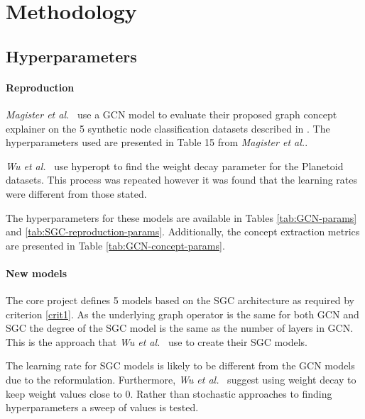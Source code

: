 \section{Methodology}

\subsection{Hyperparameters}
\label{sec:hyperparameters}

\paragraph{Reproduction}
\textit{Magister et al.}~\cite{magister2021gcexplainer} use a GCN model to evaluate their proposed graph concept explainer on the 5 synthetic node classification datasets described in .
The hyperparameters used are presented in Table 15 from \textit{Magister et al.}. 

\textit{Wu et al.}~\cite{wu2019simplifying} use hyperopt to find the weight decay parameter for the Planetoid~\cite{kipf2016semi} datasets.
This process was repeated however it was found that the learning rates were different from those stated.

The hyperparameters for these models are available in Tables \ref{tab:GCN-params} and \ref{tab:SGC-reproduction-params}.
Additionally, the concept extraction metrics are presented in Table \ref{tab:GCN-concept-params}.

%
%
%

\paragraph{New models}
The core project defines 5 models based on the SGC architecture as required by criterion \ref{crit1}.
As the underlying graph operator is the same for both GCN and SGC the degree of the SGC model is the same as the number of layers in GCN.
This is the approach that \textit{Wu et al.}~\cite{wu2019simplifying} use to create their SGC models.

The learning rate for SGC models is likely to be different from the GCN models due to the reformulation.
Furthermore, \textit{Wu et al.}~\cite{wu2019simplifying} suggest using weight decay to keep weight values close to $0$.
Rather than stochastic approaches to finding hyperparameters a sweep of values is tested.

